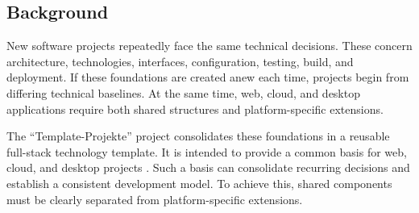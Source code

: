 \subsection{Background}
\label{subsec:ausgangslage}

New software projects repeatedly face the same technical decisions. These
concern architecture, technologies, interfaces, configuration, testing, build,
and deployment.
If these foundations are created anew each time, projects begin from differing
technical baselines. At the same time, web, cloud, and desktop applications
require both shared structures and platform-specific extensions.

The \enquote{Template-Projekte} project consolidates these foundations in a
reusable full-stack technology template. It is intended to provide a common
basis for web, cloud, and desktop projects
\parencite{kleiveist2026governance-snapshot}.
Such a basis can consolidate recurring decisions and establish a consistent
development model. To achieve this, shared components must be clearly separated
from platform-specific extensions.
